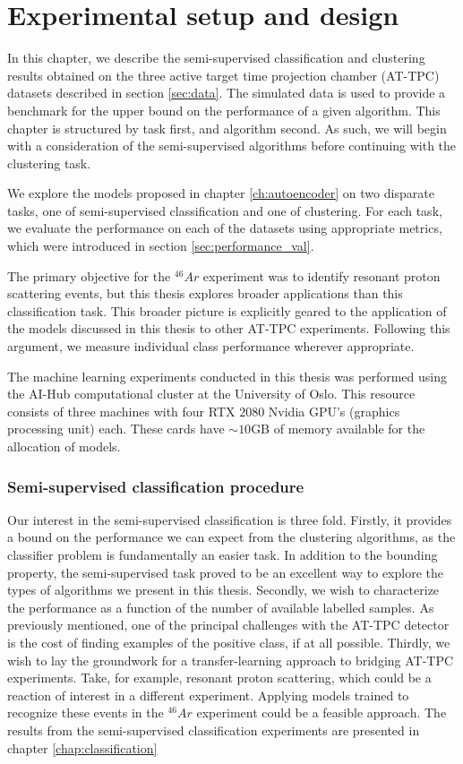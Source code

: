 \chapter{Experimental setup and design}

In this chapter, we describe the semi-supervised classification and clustering results obtained on the three active target time projection chamber (AT-TPC) datasets described in section \ref{sec:data}. The simulated data is used to provide a benchmark for the upper bound on the performance of a given algorithm. This chapter is structured by task first, and algorithm second. As such, we will begin with a consideration of the semi-supervised algorithms before continuing with the clustering task. 

 We explore the models proposed in chapter \ref{ch:autoencoder} on two disparate tasks, one of semi-supervised classification and one of clustering. For each task, we evaluate the performance on each of the datasets using appropriate metrics, which were introduced in section \ref{sec:performance_val}. 

 The primary objective for the ${}^{46}Ar$ experiment was to identify resonant proton scattering events, but this thesis explores broader applications than this classification task. This broader picture is explicitly geared to the application of the models discussed in this thesis to other AT-TPC experiments. Following this argument, we measure individual class performance wherever appropriate. 

The machine learning experiments conducted in this thesis was performed using the AI-Hub computational cluster at the University of Oslo.  This resource consists of three machines with four RTX $2080$ Nvidia GPU's (graphics processing unit) each. These cards have $\sim 10$GB of memory available for the allocation of models.

\subsection{Semi-supervised classification procedure}

Our interest in the semi-supervised classification is three fold. Firstly, it provides a bound on the performance we can expect from the clustering algorithms, as the classifier problem is fundamentally an easier task. In addition to the bounding property, the semi-supervised task proved to be an excellent way to explore the types of algorithms we present in this thesis. Secondly, we wish to characterize the performance as a function of the number of available labelled samples. As previously mentioned, one of the principal challenges with the AT-TPC detector is the cost of finding examples of the positive class, if at all possible. Thirdly, we wish to lay the groundwork for a transfer-learning approach to bridging AT-TPC experiments. Take, for example, resonant proton scattering, which could be a reaction of interest in a different experiment. Applying models trained to recognize these events in the ${}^{46}Ar$ experiment could be a feasible approach. The results from the semi-supervised classification experiments are presented in chapter \ref{chap:classification}

